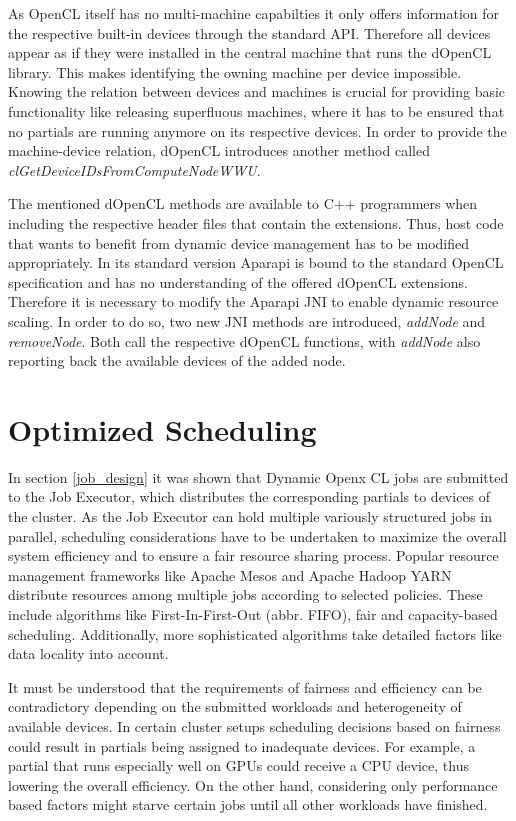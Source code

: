 As OpenCL itself has no multi-machine capabilties it only offers information for the respective built-in devices through the standard API. Therefore all devices appear as if they were installed in the central machine that runs the dOpenCL library. This makes identifying the owning machine per device impossible. Knowing the relation between devices and machines is crucial for providing basic functionality like releasing superfluous machines, where it has to be ensured that no partials are running anymore on its respective devices. In order to provide the machine-device relation, dOpenCL introduces another method called \textit{clGetDeviceIDsFromComputeNodeWWU}.

The mentioned dOpenCL methods are available to C++ programmers when including the respective header files that contain the extensions. Thus, host code that wants to benefit from dynamic device management has to be modified appropriately. In its standard version Aparapi is bound to the standard OpenCL specification and has no understanding of the offered dOpenCL extensions. Therefore it is necessary to modify the Aparapi JNI to enable dynamic resource scaling. In order to do so, two new JNI methods are introduced, \textit{addNode} and \textit{removeNode}. Both call the respective dOpenCL functions, with \textit{addNode} also reporting back the available devices of the added node.

\section{Optimized Scheduling}
\label{optimized_scheduling}
In section \ref{job_design} it was shown that Dynamic Openx CL jobs are submitted to the Job Executor, which distributes the corresponding partials to devices of the cluster. As the Job Executor can hold multiple variously structured jobs in parallel, scheduling considerations have to be undertaken to maximize the overall system efficiency and to ensure a fair resource sharing process. Popular resource management frameworks like Apache Mesos and Apache Hadoop YARN distribute resources among multiple jobs according to selected policies\cite{mesos}\cite{yarn_paper}. These include algorithms like First-In-First-Out (abbr. FIFO), fair and capacity-based scheduling. Additionally, more sophisticated algorithms take detailed factors like data locality into account.

It must be understood that the requirements of fairness and efficiency can be contradictory depending on the submitted workloads and heterogeneity of available devices. In certain cluster setups scheduling decisions based on fairness could result in partials being assigned to inadequate devices. For example, a partial that runs especially well on GPUs could receive a CPU device, thus lowering the overall efficiency. On the other hand, considering only performance based factors might starve certain jobs until all other workloads have finished.

